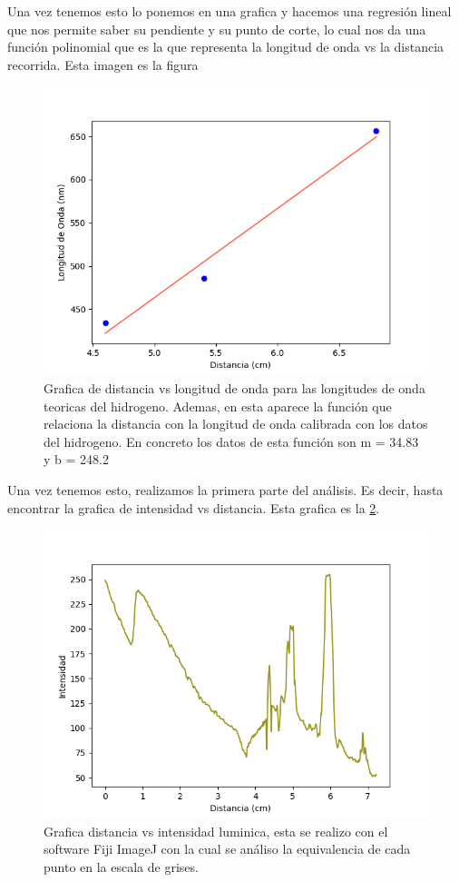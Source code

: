 \documentclass[a4paper, amsfonts, amssymb, amsmath, reprint, showkeys, nofootinbib, twoside]{revtex4-1}
\begin{document}
Una vez tenemos esto lo ponemos en una grafica y hacemos una regresión lineal que nos permite saber su pendiente y su punto de corte, lo cual nos da una función polinomial que es la que representa la longitud de onda vs la distancia recorrida. Esta imagen es la figura 
\begin{figure}[H]
    \centering
    \includegraphics[scale=0.5]{Graficas/Flambda.png}
    \caption{Grafica de distancia vs longitud de onda para las longitudes de onda teoricas del hidrogeno. Ademas, en esta aparece la función que relaciona la distancia con la longitud de onda calibrada con los datos del hidrogeno. En concreto los datos de esta función son m = 34.83 y b = 248.2}
    \label{fig:Flambda}
\end{figure}
Una vez tenemos esto, realizamos la primera parte del análisis. Es decir, hasta encontrar la grafica de intensidad vs distancia. Esta grafica es la \ref{fig:Helio}.
\begin{figure}[H]
  \centering
  \includegraphics[scale=0.5]{Graficas/Helio.png}
  \caption{Grafica distancia vs intensidad luminica, esta se realizo con el software Fiji ImageJ con la cual se análiso la equivalencia de cada punto en la escala de grises.}
  \label{fig:Helio}
\end{figure}
\end{document}
